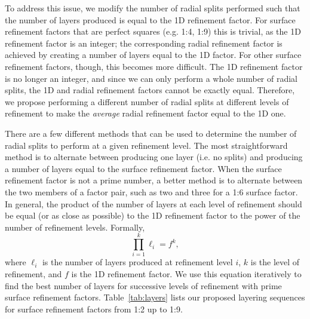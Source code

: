 To address this issue, we modify the number of radial splits performed such that the number of layers produced is equal to the 1D refinement factor.
For surface refinement factors that are perfect squares (e.g.
1:4, 1:9) this is trivial, as the 1D refinement factor is an integer; the corresponding radial refinement factor is achieved by creating a number of layers equal to the 1D factor.
For other surface refinement factors, though, this becomes more difficult.
The 1D refinement factor is no longer an integer, and since we can only perform a whole number of radial splits, the 1D and radial refinement factors cannot be exactly equal.
Therefore, we propose performing a different number of radial splits at different levels of refinement to make the \textit{average} radial refinement factor equal to the 1D one.


There are a few different methods that can be used to determine the number of radial splits to perform at a given refinement level.
The most straightforward method is to alternate between producing one layer (i.e.
no splits) and producing a number of layers equal to the surface refinement factor.
When the surface refinement factor is not a prime number, a better method is to alternate between the two members of a factor pair, such as two and three for a 1:6 surface factor.
In general, the product of the number of layers at each level of refinement should be equal (or as close as possible) to the 1D refinement factor to the power of the number of refinement levels.
Formally,
%
\begin{equation*}
\prod_{i = 1}^{k} \ell_{i} = f^{k},
\end{equation*}
%
where $\ell_{i}$ is the number of layers produced at refinement level $i$, $k$ is the level of refinement, and $f$ is the 1D refinement factor.
We use this equation iteratively to find the best number of layers for successive levels of refinement with prime surface refinement factors.
Table~\ref{tab:layers} lists our proposed layering sequences for surface refinement factors from 1:2 up to 1:9.


